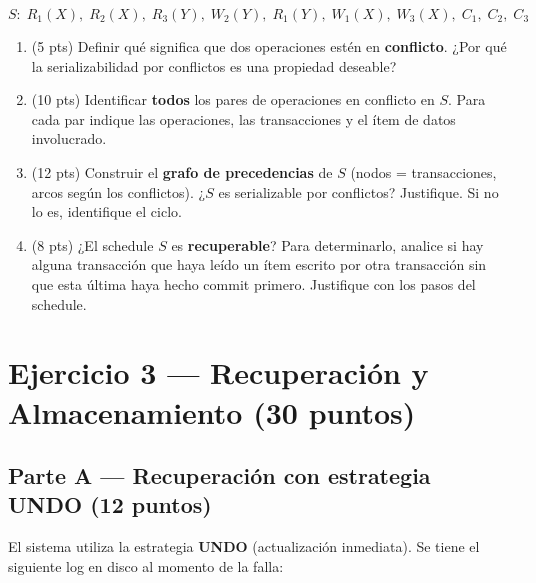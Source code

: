 \documentclass[11pt,a4paper]{article}
\begin{document}
\[
S:\; R_1(X),\; R_2(X),\; R_3(Y),\; W_2(Y),\; R_1(Y),\; W_1(X),\; W_3(X),\; C_1,\; C_2,\; C_3
\]

\begin{enumerate}
  \item (5 pts) Definir qué significa que dos operaciones estén en \textbf{conflicto}. ¿Por qué la serializabilidad por conflictos es una propiedad deseable?

  \vspace{3.5cm}

  \item (10 pts) Identificar \textbf{todos} los pares de operaciones en conflicto en $S$. Para cada par indique las operaciones, las transacciones y el ítem de datos involucrado.

  \vspace{5cm}

  \item (12 pts) Construir el \textbf{grafo de precedencias} de $S$ (nodos = transacciones, arcos según los conflictos). ¿$S$ es serializable por conflictos? Justifique. Si no lo es, identifique el ciclo.

  \vspace{5.5cm}

  \item (8 pts) ¿El schedule $S$ es \textbf{recuperable}? Para determinarlo, analice si hay alguna transacción que haya leído un ítem escrito por otra transacción sin que esta última haya hecho commit primero. Justifique con los pasos del schedule.

  \vspace{4.5cm}
\end{enumerate}

\newpage

\section*{Ejercicio 3 — Recuperación y Almacenamiento \hfill\normalfont(30 puntos)}

\subsection*{Parte A — Recuperación con estrategia UNDO (12 puntos)}

El sistema utiliza la estrategia \textbf{UNDO} (actualización inmediata). Se tiene el siguiente log en disco al momento de la falla:
\end{document}
